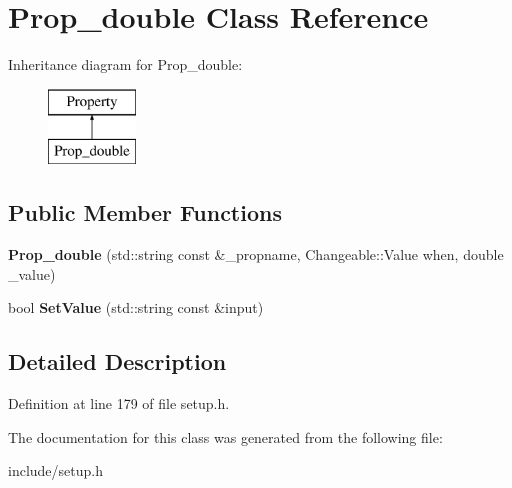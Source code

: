 \hypertarget{classProp__double}{\section{Prop\-\_\-double Class Reference}
\label{classProp__double}
}
Inheritance diagram for Prop\-\_\-double\-:\begin{figure}[H]
\begin{center}
\leavevmode
\includegraphics[height=2.000000cm]{classProp__double}
\end{center}
\end{figure}
\subsection*{Public Member Functions}
\begin{DoxyCompactItemize}
\item 
\hypertarget{classProp__double_aa0facf6624ff88ee5d29fd70c5245ae9}{{\bfseries Prop\-\_\-double} (std\-::string const \&\-\_\-propname, Changeable\-::\-Value when, double \-\_\-value)}\label{classProp__double_aa0facf6624ff88ee5d29fd70c5245ae9}

\item 
\hypertarget{classProp__double_a29d1175964f35a4aa6b5e482e3dfdf00}{bool {\bfseries Set\-Value} (std\-::string const \&input)}\label{classProp__double_a29d1175964f35a4aa6b5e482e3dfdf00}

\end{DoxyCompactItemize}


\subsection{Detailed Description}


Definition at line 179 of file setup.\-h.



The documentation for this class was generated from the following file\-:\begin{DoxyCompactItemize}
\item 
include/setup.\-h\end{DoxyCompactItemize}
